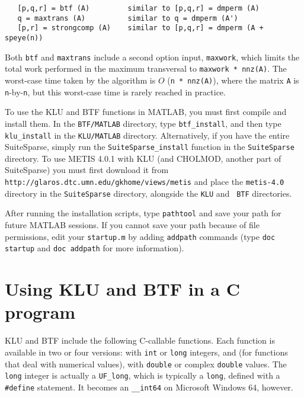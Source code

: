 \documentclass[11pt]{article}
\begin{document}
{\footnotesize
\begin{verbatim}
   [p,q,r] = btf (A)         similar to [p,q,r] = dmperm (A)
   q = maxtrans (A)          similar to q = dmperm (A')
   [p,r] = strongcomp (A)    similar to [p,q,r] = dmperm (A + speye(n))
\end{verbatim}
}

Both {\tt btf} and {\tt maxtrans} include a second option input, {\tt maxwork},
which limits the total work performed in the maximum transversal to
{\tt maxwork * nnz(A)}.  The worst-case time taken by the algorithm is
$O$ ({\tt n * nnz(A)}), where the matrix {\tt A} is {\tt n}-by-{\tt n}, but
this worst-case time is rarely reached in practice.

To use the KLU and BTF functions in MATLAB, you must first compile and install
them.  In the {\tt BTF/MATLAB} directory, type {\tt btf\_install}, and then
type {\tt klu\_install} in the {\tt KLU/MATLAB} directory.  Alternatively, if
you have the entire SuiteSparse, simply run the {\tt SuiteSparse\_install}
function in the {\tt SuiteSparse} directory.   To use METIS 4.0.1 with KLU (and
CHOLMOD, another part of SuiteSparse) you must first download it from {\tt
http://glaros.dtc.umn.edu/gkhome/views/metis} and place the {\tt metis-4.0}
directory in the {\tt SuiteSparse} directory, alongside the {\tt KLU} and {\tt
BTF} directories.

After running the installation scripts, type {\tt pathtool} and save your path
for future MATLAB sessions.  If you cannot save your path because of file
permissions, edit your {\tt startup.m} by adding {\tt addpath} commands (type
{\tt doc startup} and {\tt doc addpath} for more information).

\section{Using KLU and BTF in a C program}
\label{Cversion}

KLU and BTF include the following C-callable functions.  Each function is
available in two or four versions: with {\tt int} or {\tt long} integers, and
(for functions that deal with numerical values), with {\tt double} or complex
{\tt double} values.  The {\tt long} integer is actually a {\tt UF\_long},
which is typically a {\tt long}, defined with a {\tt \#define} statement.  It
becomes an {\tt \_\_int64} on Microsoft Windows 64, however.
\end{document}
